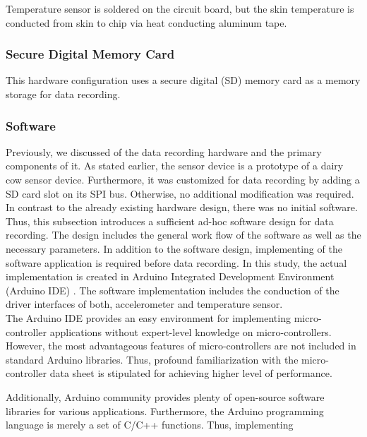 \documentclass[english,12pt,a4paper,pdftex,elec,utf8]{aaltothesis}
\begin{document}
Temperature sensor is soldered on the circuit board, but the skin temperature is conducted from skin to chip via heat conducting aluminum tape.

\subsubsection*{Secure Digital Memory Card}

This hardware configuration uses a secure digital (SD) memory card as a memory storage for data recording.



\subsubsection{Software} \label{softwaresection}

Previously, we discussed of the data recording hardware and the primary components of it. As stated earlier, the sensor device is a prototype of a dairy cow sensor device. Furthermore, it was customized for data recording by adding a SD card slot on its SPI bus. Otherwise, no additional modification was required. In contrast to the already existing hardware design, there was no initial software. Thus, this subsection introduces a sufficient ad-hoc software design for data recording. The design includes the general work flow of the software as well as the necessary parameters. In addition to the software design, implementing of the software application is required before data recording. In this study, the actual implementation is created in Arduino Integrated Development Environment (Arduino IDE) \cite{arduinoide}. The software implementation includes the conduction of the driver interfaces of both, accelerometer and temperature sensor.  \\ 

The Arduino IDE provides an easy environment for implementing micro-controller applications without expert-level knowledge on micro-controllers. However, the most advantageous features of micro-controllers are not included in standard Arduino libraries. Thus, profound familiarization with the micro-controller data sheet is stipulated for achieving higher level of performance. 

Additionally, Arduino community provides plenty of open-source software libraries for various applications. Furthermore, the Arduino programming language is merely a set of C/C++ functions. Thus, implementing 
\end{document}
